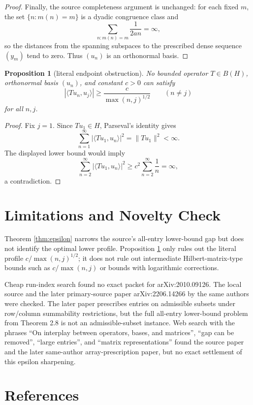 \documentclass[11pt]{amsart}
\newtheorem{proposition}{Proposition}
\begin{document}
\begin{proof}
Finally, the source completeness argument is unchanged: for each fixed \(m\),
the set \(\{n:m(n)=m\}\) is a dyadic congruence class and
\[
  \sum_{n:m(n)=m}\frac1{2an}=\infty,
\]
so the distances from the spanning subspaces to the prescribed dense sequence
\((y_m)\) tend to zero.  Thus \((u_n)\) is an orthonormal basis.
\end{proof}

\begin{proposition}[literal endpoint obstruction]\label{prop:endpoint}
No bounded operator \(T\in B(H)\), orthonormal basis \((u_n)\), and constant
\(c>0\) can satisfy
\[
  |\langle Tu_n,u_j\rangle|\ge \frac{c}{\max(n,j)^{1/2}}
  \qquad(n\ne j)
\]
for all \(n,j\).
\end{proposition}

\begin{proof}
Fix \(j=1\).  Since \(Tu_1\in H\), Parseval's identity gives
\[
  \sum_{n=1}^\infty |\langle Tu_1,u_n\rangle|^2=\|Tu_1\|^2<\infty .
\]
The displayed lower bound would imply
\[
  \sum_{n=2}^\infty |\langle Tu_1,u_n\rangle|^2
  \ge c^2\sum_{n=2}^\infty \frac1n=\infty,
\]
a contradiction.
\end{proof}

\section*{Limitations and Novelty Check}

Theorem \ref{thm:epsilon} narrows the source's all-entry lower-bound gap but
does not identify the optimal lower profile.  Proposition \ref{prop:endpoint}
only rules out the literal profile \(c/\max(n,j)^{1/2}\); it does not rule out
intermediate Hilbert-matrix-type bounds such as \(c/\max(n,j)\) or bounds with
logarithmic corrections.

Cheap run-index search found no exact packet for arXiv:2010.09126.  The local
source and the later primary-source paper arXiv:2206.14266 by the same authors
were checked.  The later paper prescribes entries on admissible subsets under
row/column summability restrictions, but the full all-entry lower-bound problem
from Theorem 2.8 is not an admissible-subset instance.  Web search with the
phrases ``On interplay between operators, bases, and matrices'', ``gap can be
removed'', ``large entries'', and ``matrix representations'' found the source
paper and the later same-author array-prescription paper, but no exact
settlement of this epsilon sharpening.

\section*{References}
\end{document}
